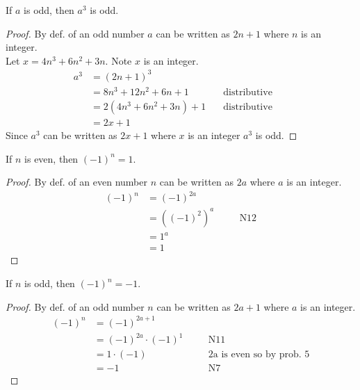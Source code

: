 \documentclass[6pt]{article}
\begin{document}
\begin{tcolorbox}[title=Problem 4, breakable]
If $a$ is odd, then $a^3$ is odd.
\end{tcolorbox}

\begin{proof}
By def. of an odd number $a$ can be written as $2n + 1$ where $n$ is an integer. \\
Let $x = 4 n^3 + 6 n^2 + 3n$. Note $x$ is an integer. 
\begin{align*}
a^3 &= {(2n + 1)}^3 & \quad \text{} && \\
&= 8 n^3 + 12 n^2 + 6n + 1 & \quad \text{distributive} && \\
&= 2 (4 n^3 + 6 n^2 + 3n) + 1 & \quad \text{distributive} && \\
&= 2 x + 1 & \quad \text{}
\end{align*}
Since $a^3$ can be written as $2x + 1$ where $x$ is an integer $a^3$ is odd.
\end{proof}

\begin{tcolorbox}[title=Problem 5, breakable]
If $n$ is even, then ${(-1)}^n = 1$.
\end{tcolorbox}

\begin{proof}
By def. of an even number $n$ can be written as $2a$ where $a$ is an integer.
\begin{align*}
{(-1)}^n &= {(-1)}^{2a} && \\
&= {((-1)^2)}^{a} && \quad \text{N12} \\
&= {1}^{a} && \quad \text{} \\
&= 1
\end{align*}
\end{proof}

\begin{tcolorbox}[title=Problem 6, breakable]
If $n$ is odd, then ${(-1)}^n = -1$.
\end{tcolorbox}

\begin{proof}
By def. of an odd number $n$ can be written as $2a + 1$ where $a$ is an integer.
\begin{align*}
{(-1)}^n &= {(-1)}^{2a + 1} && \\
&= {(-1)}^{2a} \cdot {(-1)}^1 && \quad \text{N11} \\
&= 1 \cdot (-1) && \quad \text{2a is even so by prob. $5$} \\
&= -1 && \quad \text{N7}
\end{align*}
\end{proof}
\end{document}
